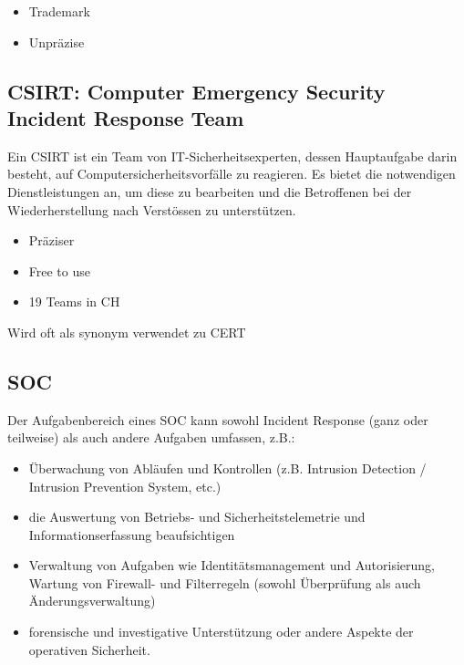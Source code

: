 \begin{itemize}
    \item Trademark
    \item Unpräzise
\end{itemize}

\subsection{CSIRT: Computer Emergency Security Incident Response Team}\label{subsec:csirt}
Ein CSIRT ist ein Team von IT-Sicherheitsexperten, dessen Hauptaufgabe darin besteht, auf Computersicherheitsvorfälle zu reagieren. Es bietet die notwendigen Dienstleistungen an, um diese zu bearbeiten und die Betroffenen bei der Wiederherstellung nach Verstössen zu unterstützen.

\begin{itemize}
    \item Präziser
    \item Free to use
    \item 19 Teams in CH
\end{itemize}
 Wird oft als synonym verwendet zu CERT

\subsection{SOC}\label{subsec:soc}
Der Aufgabenbereich eines SOC kann sowohl Incident Response (ganz oder teilweise) als auch andere Aufgaben umfassen, z.B.:

\begin{itemize}
    \item Überwachung von Abläufen und Kontrollen (z.B. Intrusion Detection / Intrusion Prevention System, etc.)
    \item die Auswertung von Betriebs- und Sicherheitstelemetrie und Informationserfassung beaufsichtigen
    \item Verwaltung von Aufgaben wie Identitätsmanagement und Autorisierung, Wartung von Firewall- und Filterregeln (sowohl Überprüfung als auch Änderungsverwaltung)
    \item forensische und investigative Unterstützung oder andere Aspekte der operativen Sicherheit.
\end{itemize}

